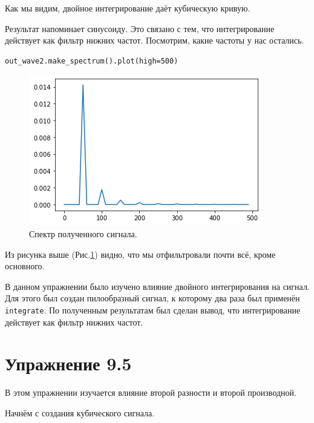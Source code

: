 \documentclass[a4paper, 14pt]{extarticle}
\begin{document}
    Как мы видим, двойное интегрирование даёт кубическую кривую.

    Результат напоминает синусоиду. Это связано с тем, что интегрирование действует как фильтр нижних частот.
    Посмотрим, какие частоты у нас остались.

    \begin{lstlisting}[caption= Получение спектра., label={lst:task4_spectrum_after}]
out_wave2.make_spectrum().plot(high=500)    \end{lstlisting}

    \begin{figure}[h]
        \centering
        \includegraphics[width=0.8\linewidth]{resources/Images/task4_spectrum_after}
        \caption{Спектр полученного сигнала.}
        \label{fig:task4_spectrum_after}
    \end{figure}

    Из рисунка выше (Рис.\ref{fig:task4_spectrum_after}) видно, что мы отфильтровали почти всё, кроме основного.

    В данном упражнении было изучено влияние двойного интегрирования на сигнал. Для этого был создан
    пилообразный сигнал, к которому два раза был применён \texttt{integrate}. По полученным результатам был сделан вывод,
    что интегрирование действует как фильтр нижних частот.

    \newpage

    \section{Упражнение 9.5}
    \label{sec:task5}

    В этом упражнении изучается влияние второй разности и второй производной.

    Начнём с создания кубического сигнала.
\end{document}
